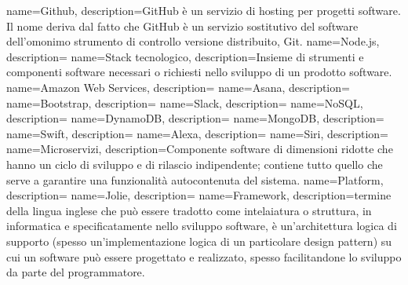  {
	name=Github,
	description={GitHub è un servizio di hosting per progetti software. Il nome deriva dal fatto che GitHub è un servizio sostitutivo del software dell'omonimo strumento di controllo versione distribuito, Git.}
}
 {
	name=Node.js,
	description={}
}
 {
	name=Stack tecnologico,
	description={Insieme di strumenti e componenti software necessari o richiesti nello sviluppo di un prodotto software.}
}
 {
	name=Amazon Web Services,
	description={}
}
 {
	name=Asana,
	description={}
}
 {
	name=Bootstrap,
	description={}
}
 {
	name=Slack,
	description={}
}
 {
	name=NoSQL,
	description={}
}
 {
	name=DynamoDB,
	description={}
}
 {
	name=MongoDB,
	description={}
}
 {
	name=Swift,
	description={}
}
 {
	name=Alexa,
	description={}
}
 {
	name=Siri,
	description={}
}
 {
	name=Microservizi,
	description={Componente software di dimensioni ridotte che hanno un ciclo di sviluppo e di rilascio indipendente; contiene tutto quello che serve a garantire una funzionalità autocontenuta del sistema.}
}
 {
	name=Platform,
	description={}
}
 {
	name=Jolie,
	description={}
}
 {
	name=Framework,
	description={termine della lingua inglese che può essere tradotto come intelaiatura o struttura, in informatica e specificatamente nello sviluppo software, è un'architettura logica di supporto (spesso un'implementazione logica di un particolare design pattern) su cui un software può essere progettato e realizzato, spesso facilitandone lo sviluppo da parte del programmatore.}
}
